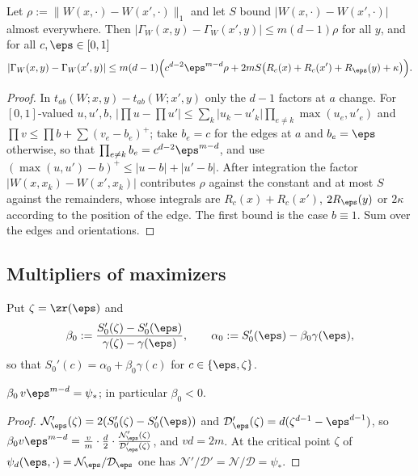 \begin{lemma}\label{kb:lem:two-rows}
Let $\rho:=\|W(x,\cdot)-W(x',\cdot)\|_1$ and let $S$ bound $|W(x,\cdot)-W(x',\cdot)|$ almost
everywhere.  Then $|\Gamma_W(x,y)-\Gamma_W(x',y)|\le m(d-1)\rho$ for all $y$, and for all
$c,\eps\in[0,1]$
\[
  |\Gamma_W(x,y)-\Gamma_W(x',y)|
  \le m(d-1)\Bigl(c^{d-2}\eps^{m-d}\rho
     +2mS\bigl(R_c(x)+R_c(x')+R_\eps(y)+\kappa\bigr)\Bigr).
\]
\end{lemma}

\begin{proof}
In $t_{ab}(W;x,y)-t_{ab}(W;x',y)$ only the $d-1$ factors at $a$ change.  For $[0,1]$-valued
$u,u',b$,
$|\prod u-\prod u'|\le\sum_k|u_k-u'_k|\prod_{e\ne k}\max(u_e,u'_e)$ and
$\prod v\le\prod b+\sum(v_e-b_e)^+$; take $b_e=c$ for the edges at $a$ and $b_e=\eps$
otherwise, so that $\prod_{e\ne k}b_e=c^{d-2}\eps^{m-d}$, and use
$(\max(u,u')-b)^+\le|u-b|+|u'-b|$.  After integration the factor $|W(x,x_k)-W(x',x_k)|$
contributes $\rho$ against the constant and at most $S$ against the remainders, whose integrals
are $R_c(x)+R_c(x')$, $2R_\eps(y)$ or $2\kappa$ according to the position of the edge.  The
first bound is the case $b\equiv1$.  Sum over the edges and orientations.
\end{proof}

\subsection{Multipliers of maximizers}
\label{kb:sec:cluster}

Put $\zeta=\zr(\eps)$ and
\[
  \beta_0:=\frac{S_0'(\zeta)-S_0'(\eps)}{\gamma(\zeta)-\gamma(\eps)},\qquad
  \alpha_0:=S_0'(\eps)-\beta_0\gamma(\eps),
\]
so that $S_0'(c)=\alpha_0+\beta_0\gamma(c)$ for $c\in\{\eps,\zeta\}$.

\begin{lemma}\label{kb:lem:beta0}
$\beta_0\,v\eps^{m-d}=\psi_*$; in particular $\beta_0<0$.
\end{lemma}

\begin{proof}
$\mathcal N_\eps'(\zeta)=2(S_0'(\zeta)-S_0'(\eps))$ and
$\mathcal D_\eps'(\zeta)=d(\zeta^{d-1}-\eps^{d-1})$, so $\beta_0v\eps^{m-d}
=\frac{v}{m}\cdot\frac d2\cdot\frac{\mathcal N_\eps'(\zeta)}{\mathcal D_\eps'(\zeta)}$, and
$vd=2m$.  At the critical point $\zeta$ of $\psi_d(\eps,\cdot)=\mathcal N_\eps/\mathcal D_\eps$ one
has $\mathcal N'/\mathcal D'=\mathcal N/\mathcal D=\psi_*$.
\end{proof}

